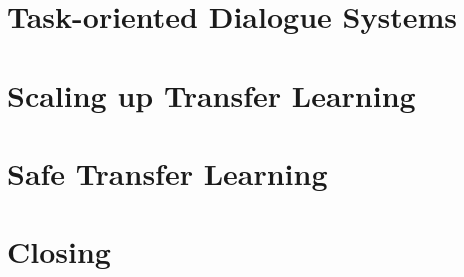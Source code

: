 \documentclass[12pt,fleqn]{book} %
\begin{document}
    

    

    \part{Task-oriented Dialogue Systems}
    \label{part:task-oriented-dialogue-systems}
    
    
    

    \part{Scaling up Transfer Learning}
    \label{part:contributions-scaling}
    
    

    \part{Safe Transfer Learning}
    \label{part:contributions-safe}
    
    

    \part{Closing}
    \label{part:closing}
    
    

    
\end{document}
